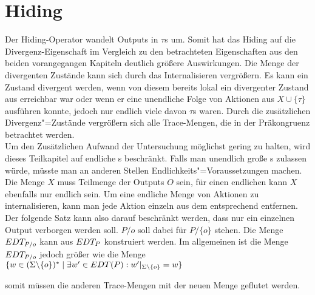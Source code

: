 \section{Hiding}

Der Hiding-Operator wandelt Outputs in $\tau$s um. Somit hat das Hiding auf die
Divergenz-Eigenschaft im Vergleich zu den betrachteten Eigenschaften aus den
beiden vorangegangen Kapiteln deutlich größere Auswirkungen. Die Menge der
divergenten Zustände kann sich durch das Internalisieren vergrößern. Es kann
ein Zustand divergent werden, wenn von diesem bereits lokal ein divergenter
Zustand aus erreichbar war oder wenn er eine unendliche Folge von Aktionen aus
$X\cup \{\tau\}$ ausführen konnte, jedoch nur endlich viele davon $\tau$s
waren. Durch die zusätzlichen Divergenz"=Zustände vergrößern sich alle
Trace-Mengen, die in der Präkongruenz \DRel{} betrachtet werden.\\
Um den Zusätzlichen Aufwand der Untersuchung möglichst gering zu halten, wird
dieses Teilkapitel auf endliche \MEIO{}s beschränkt. Falls man unendlich große
\MEIO{}s zulassen würde, müsste man an anderen Stellen
Endlichkeits"=Voraussetzungen machen.\\
Die Menge $X$ muss Teilmenge der Outputs $O$ sein, für einen endlichen \MEIO{}
kann $X$ ebenfalls nur endlich sein. Um eine endliche Menge von Aktionen zu
internalisieren, kann man jede Aktion einzeln aus dem entsprechend \MEIO{}
entfernen. Der folgende Satz kann also darauf beschränkt werden, dass nur ein
einzelnen Output verborgen werden soll. $P/o$ soll dabei für $P/\{o\}$ stehen.
Die Menge $EDT _{P/o}$ kann aus $EDT _P$ konstruiert werden. Im allgemeinen
ist die Menge $EDT _{P/o}$ jedoch größer wie die Menge $\{w\in
(\Sigma\backslash \{o\})^*\mid \exists w'\in EDT(P): w'|_{\Sigma\backslash
\{o\}} = w\}$


somit müssen die anderen Trace-Mengen mit der neuen Menge
geflutet werden.


